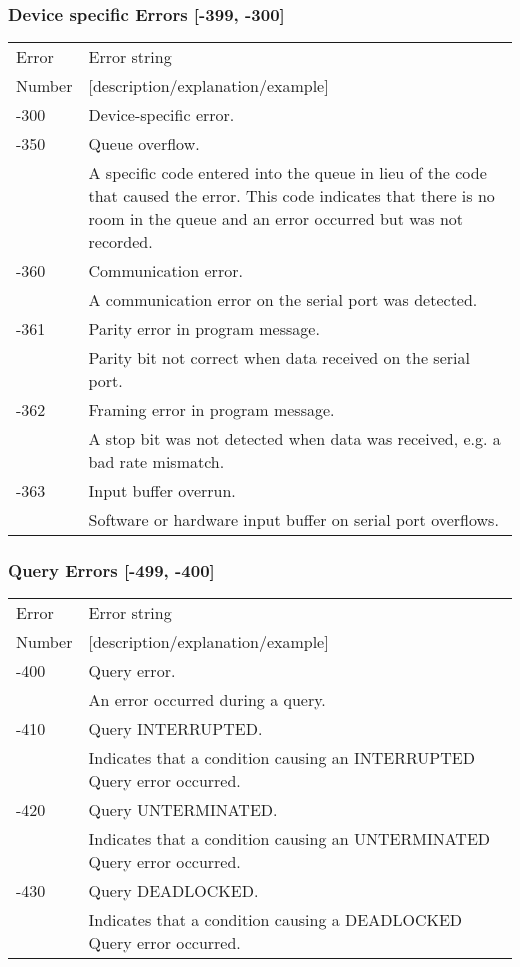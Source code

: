 \subsubsection{Device specific Errors [-399, -300]}
\begin{longtable}{|l|p{25em}|}
\hline
Error			& Error string \\ 
Number		& [description/explanation/example] \\ \hline
-300			& Device-specific error.\\ \hline
-350			& Queue overflow.\\ \hline
					& A specific code entered into the queue in lieu of the code that caused the error. This code indicates that there is no room in the queue and an error occurred but was not recorded.\\ \hline
-360			& Communication error.\\ \cline{2-2}
					& A communication error on the serial port was detected.\\ \hline
-361			& Parity error in program message.\\ \cline{2-2}
					& Parity bit not correct when data received on the serial port.\\ \hline
-362			& Framing error in program message.\\ \cline{2-2}
					& A stop bit was not detected when data was received, e.g. a bad rate mismatch.\\ \hline
-363			& Input buffer overrun.\\ \cline{2-2}
					& Software or hardware input buffer on serial port overflows.\\ \hline
\end{longtable}

\subsubsection{Query Errors [-499, -400]}
\begin{longtable}{|l|p{25em}|}
\hline
Error			& Error string \\ 
Number		& [description/explanation/example] \\ \hline
-400			& Query error.\\ \cline{2-2}
					& An error occurred during a query.\\ \hline
-410			& Query INTERRUPTED.\\ \cline{2-2}
					& Indicates that a condition causing an INTERRUPTED Query error occurred.\\ \hline
-420			& Query UNTERMINATED.\\ \cline{2-2}
					& Indicates that a condition causing an UNTERMINATED Query error occurred.\\ \hline
-430			& Query DEADLOCKED.\\ \cline{2-2}
					& Indicates that a condition causing a DEADLOCKED Query error occurred.\\ \hline
\end{longtable}
